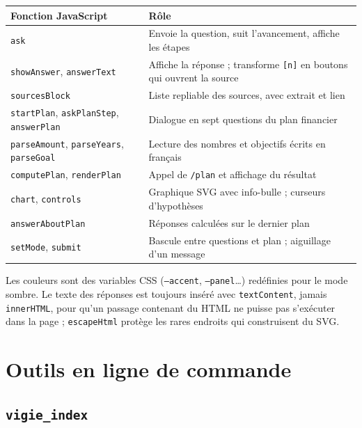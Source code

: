 \documentclass[11pt,a4paper]{article}
\begin{document}
{{{\begin{center}
\small
\begin{tabularx}{\linewidth}{@{}l X@{}}
\toprule
Fonction JavaScript & Rôle \\
\midrule
\texttt{ask} & Envoie la question, suit l'avancement, affiche les étapes \\
\texttt{showAnswer}, \texttt{answerText} & Affiche la réponse ; transforme \texttt{[n]} en boutons qui ouvrent la source \\
\texttt{sourcesBlock} & Liste repliable des sources, avec extrait et lien \\
\texttt{startPlan}, \texttt{askPlanStep}, \texttt{answerPlan} & Dialogue en sept questions du plan financier \\
\texttt{parseAmount}, \texttt{parseYears}, \texttt{parseGoal} & Lecture des nombres et objectifs écrits en français \\
\texttt{computePlan}, \texttt{renderPlan} & Appel de \texttt{/plan} et affichage du résultat \\
\texttt{chart}, \texttt{controls} & Graphique SVG avec info-bulle ; curseurs d'hypothèses \\
\texttt{answerAboutPlan} & Réponses calculées sur le dernier plan \\
\texttt{setMode}, \texttt{submit} & Bascule entre questions et plan ; aiguillage d'un message \\
\bottomrule
\end{tabularx}
\end{center}


Les couleurs sont des variables CSS (\texttt{--accent}, \texttt{--panel}\dots) redéfinies pour le mode sombre. Le texte des réponses est toujours inséré avec \texttt{textContent}, jamais \texttt{innerHTML}, pour qu'un passage contenant du HTML ne puisse pas s'exécuter dans la page ; \texttt{escapeHtml} protège les rares endroits qui construisent du SVG.

\section{Outils en ligne de commande}

\subsection{\texttt{vigie\_index}}

}}}
\end{document}

